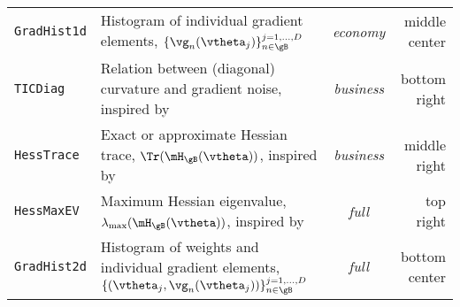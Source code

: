 {\begin{table*}
\begin{center}
\begin{tabularx}{\textwidth}{lXcr}
    	\texttt{GradHist1d} & Histogram of individual gradient elements, $\{\vg_n(\vtheta_j)\}_{n\in \gB}^{j=1,\dots,D}$                           & \textit{economy}  & middle \textcolor{sns_orange}{center} \\
    	\texttt{TICDiag}    & Relation between (diagonal) curvature and gradient noise, inspired by \citep{Thomas2020}                             & \textit{business} & bottom \textcolor{sns_green}{right}   \\
    	\texttt{HessTrace}  & Exact or approximate Hessian trace, $\Tr(\mH_{\gB}(\vtheta))$, inspired by \citep{Yao2020}                           & \textit{business} & middle \textcolor{sns_green}{right}   \\
    	\texttt{HessMaxEV}  & Maximum Hessian eigenvalue, $\lambda_{\text{max}}(\mH_{\gB}(\vtheta))$, inspired by \citep{Yao2020}                  & \textit{full}     & top \textcolor{sns_green}{right}      \\
    	\texttt{GradHist2d} & Histogram of weights and individual gradient elements, $\{ (\vtheta_j,\vg_n(\vtheta_j))\}_{n\in \gB}^{j=1,\dots,D}$  & \textit{full}     & bottom \textcolor{sns_orange}{center} \\
    	\bottomrule
    \end{tabularx}
	\end{center}
\end{table*}
}


